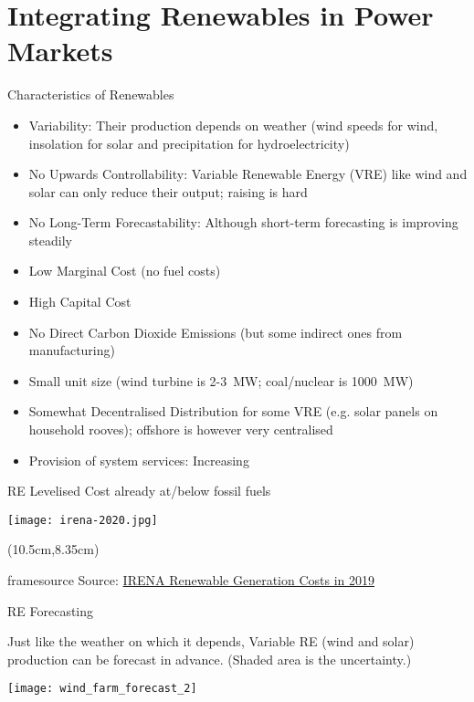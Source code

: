 \documentclass[10pt,aspectratio=169,dvipsnames]{beamer}
\newcommand{\source}[1]{\begin{textblock*}{5cm}(10.5cm,8.35cm)
    \begin{beamercolorbox}[ht=0.5cm,right]{framesource}
        \usebeamerfont{framesource}\usebeamercolor[fg]{framesource} Source: {#1}
    \end{beamercolorbox}
\end{textblock*}}
\let\olditem\item
\renewcommand{\item}{%
\olditem\vspace{5pt}}
\begin{document}
\section{Integrating Renewables in Power Markets}


\begin{frame}{Characteristics of Renewables}

  \begin{itemize}
  \item \alert{Variability}: Their production depends on weather (wind speeds for wind, insolation for solar and precipitation for hydroelectricity)
  \item \alert{No Upwards Controllability}: Variable Renewable Energy (VRE) like wind and solar can only reduce their output; raising is hard
  \item \alert{No Long-Term Forecastability}: Although short-term forecasting is improving steadily
  \item \alert{Low Marginal Cost} (no fuel costs)
  \item \alert{High Capital Cost}
  \item \alert{No Direct Carbon Dioxide Emissions} (but some indirect ones from manufacturing)
  \item \alert{Small unit size} (wind turbine is 2-3~MW; coal/nuclear is 1000~MW)
  \item \alert{Somewhat Decentralised Distribution} for some VRE (e.g. solar panels on household rooves); offshore is however very centralised
    \item \alert{Provision of system services}: Increasing
  \end{itemize}

\end{frame}

\begin{frame}{RE Levelised Cost already at/below fossil fuels}

  \centering
  \texttt{[image: irena-2020.jpg]}

  \source{\href{https://www.irena.org/publications/2020/Jun/Renewable-Power-Costs-in-2019}{IRENA Renewable Generation Costs in 2019}}
\end{frame}


\begin{frame}{RE Forecasting}

  Just like the weather on which it depends, Variable RE (wind and
  solar) production can be forecast in advance.   (Shaded area is the uncertainty.)

  \centering
  \texttt{[image: wind\_farm\_forecast\_2]}
\end{frame}
\end{document}
